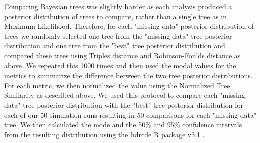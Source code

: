 \documentclass[12pt,letterpaper]{article}
\begin{document}




Comparing Bayesian trees was slightly harder as each analysis produced a posterior distribution of trees to compare, rather than a single tree as in Maximum Likelihood.
Therefore, for each "missing-data" posterior distribution of trees we randomly selected one tree from the "missing-data" tree posterior distribution and one tree from the "best" tree posterior distribution and compared these trees using Triples distance and Robinson-Foulds distance as above.
We repeated this 1000 times and then used the modal values for the metrics to summarize the difference between the two tree posterior distributions.
For each metric, we then normalized the value using the Normalized Tree Similarity as described above.
We used this protocol to compare each "missing-data" tree posterior distribution with the "best" tree posterior distribution for each of our 50 simulation runs resulting in 50 comparisons for each "missing-data" tree.
We then calculated the mode and the 50\% and 95\% confidence intervals from the resulting distribution using the hdrcde R package v3.1 \citep{hdrcde}. %
\end{document}
